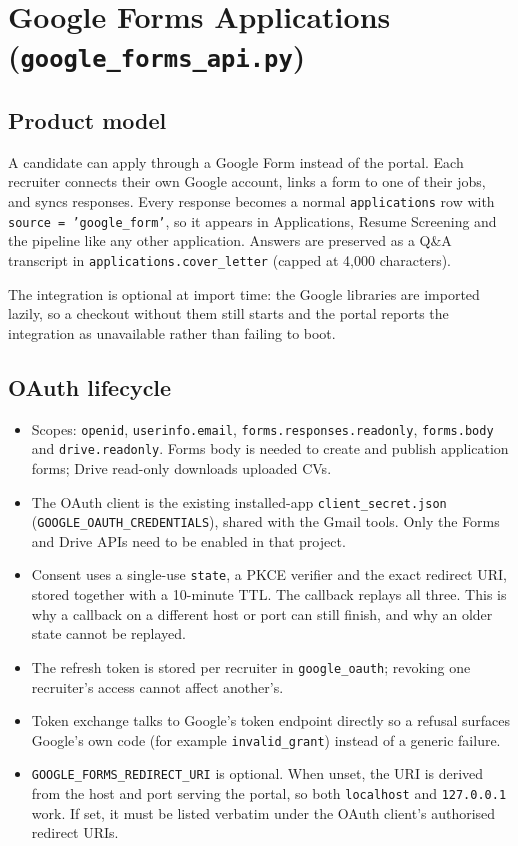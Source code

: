 \documentclass[11pt,a4paper]{article}
\newcommand{\file}[1]{\texttt{\small #1}}
\newcommand{\code}[1]{\texttt{#1}}
\newcommand{\env}[1]{\texttt{\small #1}}
\begin{document}
\section{Google Forms Applications (\file{google\_forms\_api.py})}
\label{u:gforms}

\subsection{Product model}
A candidate can apply through a Google Form instead of the portal. Each
recruiter connects their own Google account, links a form to one of their jobs,
and syncs responses. Every response becomes a normal \code{applications} row
with \code{source = 'google\_form'}, so it appears in Applications, Resume
Screening and the pipeline like any other application. Answers are preserved
as a Q\&A transcript in \code{applications.cover\_letter} (capped at 4{,}000
characters).

The integration is optional at import time: the Google libraries are imported
lazily, so a checkout without them still starts and the portal reports the
integration as unavailable rather than failing to boot.

\subsection{OAuth lifecycle}
\begin{itemize}[leftmargin=2em]
  \item Scopes: \code{openid}, \code{userinfo.email},
        \code{forms.responses.readonly}, \code{forms.body} and
        \code{drive.readonly}. Forms body is needed to create and publish
        application forms; Drive read-only downloads uploaded CVs.
  \item The OAuth client is the existing installed-app
        \file{client\_secret.json} (\env{GOOGLE\_OAUTH\_CREDENTIALS}), shared
        with the Gmail tools. Only the Forms and Drive APIs need to be enabled
        in that project.
  \item Consent uses a single-use \code{state}, a PKCE verifier and the exact
        redirect URI, stored together with a 10-minute TTL. The callback
        replays all three. This is why a callback on a different host or port
        can still finish, and why an older state cannot be replayed.
  \item The refresh token is stored per recruiter in \code{google\_oauth};
        revoking one recruiter's access cannot affect another's.
  \item Token exchange talks to Google's token endpoint directly so a refusal
        surfaces Google's own code (for example \code{invalid\_grant}) instead
        of a generic failure.
  \item \env{GOOGLE\_FORMS\_REDIRECT\_URI} is optional. When unset, the URI
        is derived from the host and port serving the portal, so both
        \code{localhost} and \code{127.0.0.1} work. If set, it must be listed
        verbatim under the OAuth client's authorised redirect URIs.
\end{itemize}
\end{document}
